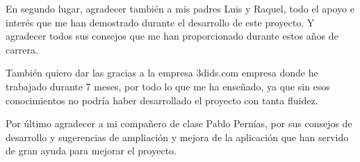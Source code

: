 \vspace{5 mm}

En segundo lugar, agradecer también a mis padres Luis y Raquel, todo el apoyo e interés que me han demostrado durante el desarrollo de este proyecto.
Y agradecer todos sus consejos que me han proporcionado durante estos años de carrera.

\vspace{5 mm}

También quiero dar las gracias a la empresa 3dids.com empresa donde he trabajado durante 7 meses, por todo lo que me ha enseñado, ya que sin esos
conocimientos no podría haber desarrollado el proyecto con tanta fluidez.


\vspace{5 mm}

Por último agradecer a mi compañero de clase Pablo Pernías, por sus consejos de desarrollo y sugerencias de ampliación y mejora de la
 aplicación que han servido de gran ayuda para mejorar el proyecto.
